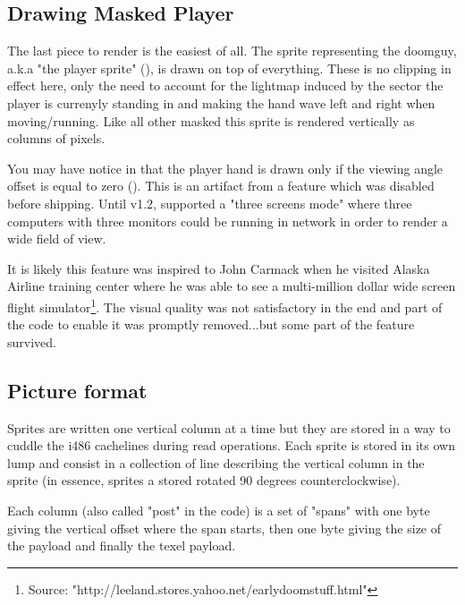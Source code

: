 \subsection{Drawing Masked Player}
The last piece to render is the easiest of all. The sprite representing the doomguy, a.k.a "the player sprite" (), is drawn on top of everything. These is no clipping in effect here, only the need to account for the lightmap induced by the sector the player is currenyly standing in and making the hand wave left and right when moving/running. Like all other masked this sprite is rendered vertically as columns of pixels.\\
\par
You may have notice in  that the player hand is drawn only if the viewing angle offset is equal to zero (). This is an artifact from a feature which was disabled before shipping. Until v1.2, \doom{}supported a "three screens mode" where three computers with three monitors could be running in network in order to render a wide field of view.\\
\par
{}
\par
It is likely this feature was inspired to John Carmack when he visited Alaska Airline training center where he was able to see a multi-million dollar wide screen flight simulator\footnote{Source: "http://leeland.stores.yahoo.net/earlydoomstuff.html"}. The visual quality was not satisfactory in the end and part of the code to enable it was promptly removed...but some part of the feature survived.\\
\par

\subsection{Picture format}
Sprites are written one vertical column at a time but they are stored in a way to cuddle the i486 cachelines during read operations. Each sprite is stored in its own lump and consist in a collection of line describing the vertical column in the sprite (in essence, sprites a stored rotated 90 degrees counterclockwise).\\
\par
Each column (also called "post" in the code) is a set of "spans" with one byte giving the vertical offset where the span starts, then one byte giving the size of the payload and finally the texel payload.
\pagebreak


